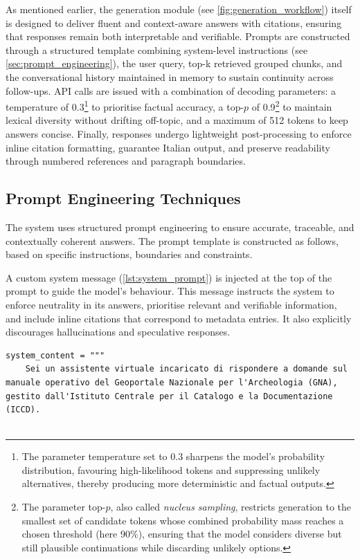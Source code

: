 \begin{spacing}{1.5}
As mentioned earlier, the generation module (see \autoref{fig:generation_workflow}) itself is designed to deliver fluent and context-aware answers with citations, ensuring that responses remain both interpretable and verifiable. Prompts are constructed through a structured template combining system-level instructions (see \autoref{sec:prompt_engineering}), the user query, top-k retrieved grouped chunks, and the conversational history maintained in memory to sustain continuity across follow-ups. API calls are issued with a combination of decoding parameters: a temperature of 0.3\footnote{The parameter temperature set to 0.3 sharpens the model’s probability distribution, favouring high-likelihood tokens and suppressing unlikely alternatives, thereby producing more deterministic and factual outputs.} to prioritise factual accuracy, a top-$p$ of 0.9\footnote{The parameter top-$p$, also called \textit{nucleus sampling}, restricts generation to the smallest set of candidate tokens whose combined probability mass reaches a chosen threshold (here 90\%), ensuring that the model considers diverse but still plausible continuations while discarding unlikely options.} to maintain lexical diversity without drifting off-topic, and a maximum of 512 tokens to keep answers concise. Finally, responses undergo lightweight post-processing to enforce inline citation formatting, guarantee Italian output, and preserve readability through numbered references and paragraph boundaries.



\subsection{Prompt Engineering Techniques} \label{sec:prompt_engineering}
The system uses structured prompt engineering to ensure accurate, traceable, and contextually coherent answers. The prompt template is constructed as follows, based on specific instructions, boundaries and constraints.

A custom system message (\autoref{lst:system_prompt}) is injected at the top of the prompt to guide the model’s behaviour. This message instructs the system to enforce neutrality in its answers, prioritise relevant and verifiable information, and include inline citations that correspond to metadata entries. It also explicitly discourages hallucinations and speculative responses.

\vspace{0.6em}
\begin{lstlisting}[breaklines=true,
                  frame=none,
                   caption={System prompt specifying assistant constraints and response instructions.},
                   captionpos=b,
                   label={lst:system_prompt},
  xleftmargin=0.05\textwidth,
  xrightmargin=0.05\textwidth]
system_content = """
    Sei un assistente virtuale incaricato di rispondere a domande sul manuale operativo del Geoportale Nazionale per l'Archeologia (GNA), gestito dall'Istituto Centrale per il Catalogo e la Documentazione (ICCD).


\end{lstlisting}
\end{spacing}
